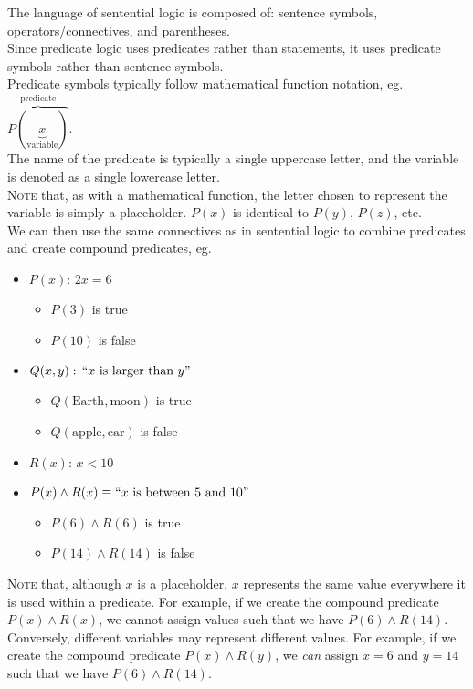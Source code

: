\documentclass{article}
\begin{document}
The language of sentential logic is composed of: sentence symbols, operators/connectives, and parentheses.\\
Since predicate logic uses predicates rather than statements, it uses predicate symbols rather than sentence symbols.\\ Predicate symbols typically follow mathematical function notation, eg. $\overbrace{P(\underbrace{x}_{\text{variable}})}^{\text{predicate}}$.\\
The name of the predicate is typically a single uppercase letter, and the variable is denoted as a single lowercase letter.\\[1ex]
\textsc{Note} that, as with a mathematical function, the letter chosen to represent the variable is simply a placeholder. $P(x)$ is identical to $P(y),\,P(z)$, etc.\\[1em]
We can then use the same connectives as in sentential logic to combine predicates and create compound predicates, eg.
\begin{itemize}
\item $P(x):\,2x=6$
	\begin{itemize}
	\item $P(3)$ is true
	\item $P(10)$ is false
	\end{itemize}
\item $Q(x,y):\,``x\text{ is larger than }y"$
	\begin{itemize}
	\item $Q(\text{Earth},\text{moon})$ is true
	\item $Q(\text{apple},\text{car})$ is false
	\end{itemize}
\item $R(x):\,x<10$
\item $P(x)\wedge R(x)\equiv ``x\text{ is between 5 and 10}"$
	\begin{itemize}
	\item $P(6)\wedge R(6)$ is true
	\item $P(14)\wedge R(14)$ is false
	\end{itemize}
\end{itemize}
\textsc{Note} that, although $x$ is a placeholder, $x$ represents the same value everywhere it is used within a predicate. For example, if we create the compound predicate $P(x)\wedge R(x)$, we cannot assign values such that we have $P(6)\wedge R(14)$.\\[1ex]
Conversely, different variables may represent different values. For example, if we create the compound predicate $P(x)\wedge R(y)$, we \textit{can} assign $x=6$ and $y=14$ such that we have $P(6)\wedge R(14)$.
\end{document}
